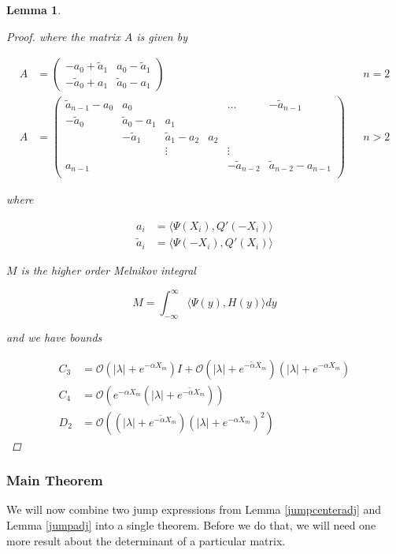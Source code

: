 \documentclass[12pt]{article}
\newtheorem{lemma}{Lemma}
\begin{document}
\begin{lemma}
\begin{proof}
where the matrix $A$ is given by

\begin{align*}
A &= \begin{pmatrix}
-a_0 + \tilde{a}_1 & a_0 - \tilde{a}_1 \\
-\tilde{a}_0 + a_1 & \tilde{a}_0 - a_1
\end{pmatrix} && n = 2 \\
A &= \begin{pmatrix}
\tilde{a}_{n-1} - a_0 & a_0 & & & \dots & -\tilde{a}_{n-1}\\
-\tilde{a}_0 & \tilde{a}_0 - a_1 &  a_1 \\
& -\tilde{a}_1 & \tilde{a}_1 - a_2 &  a_2 \\
& & \vdots & & \vdots \\
a_{n-1} & & & & -\tilde{a}_{n-2} & \tilde{a}_{n-2} - a_{n-1} \\
\end{pmatrix} && n > 2
\end{align*}

where

\begin{align*}
a_i &= \langle \Psi(X_i), Q'(-X_i) \rangle \\
\tilde{a}_i &= \langle \Psi(-X_i), Q'(X_i) \rangle
\end{align*}

$M$ is the higher order Melnikov integral

\[
M = \int_{-\infty}^\infty \langle \Psi(y), H(y) \rangle dy
\]

and we have bounds

\begin{align*}
C_3 &= \mathcal{O}(|\lambda| + e^{-\alpha X_m}) I
+ \mathcal{O}(|\lambda| + e^{-\tilde{\alpha} X_m})( |\lambda| + e^{-\alpha X_m})\\
C_4 &= \mathcal{O}(e^{-\alpha X_m}(|\lambda| + e^{-\tilde{\alpha} X_m})) \\
D_2 &= \mathcal{O}((|\lambda| + e^{-\tilde{\alpha} X_m})(|\lambda| + e^{-\alpha X_m})^2)
\end{align*}

\end{proof}
\end{lemma}

\subsubsection{Main Theorem}

We will now combine two jump expressions from Lemma \ref{jumpcenteradj} and Lemma \ref{jumpadj} into a single theorem. Before we do that, we will need one more result about the determinant of a particular matrix.
\end{document}
